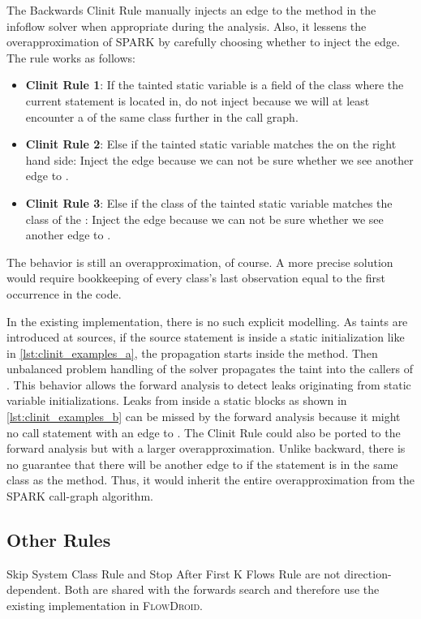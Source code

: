 \documentclass[../draft.tex]{subfiles}
\begin{document}
    The Backwards Clinit Rule manually injects an edge to the  method in the infoflow solver when appropriate during the analysis.
    Also, it lessens the overapproximation of SPARK by carefully choosing whether to inject the edge. The rule works as follows:
    \begin{itemize}
        \item \textbf{Clinit Rule 1}: If the tainted static variable is a field of the class where the current statement is located in, do not inject because we will at least encounter a  of the same class further in the call graph.
        \item \textbf{Clinit Rule 2}: Else if the tainted static variable matches the  on the right hand side: Inject the edge because we can not be sure whether we see another edge to .
        \item \textbf{Clinit Rule 3}: Else if the class of the tainted static variable matches the class of the : Inject the edge because we can not be sure whether we see another edge to .
    \end{itemize}
    The behavior is still an overapproximation, of course.
    A more precise solution would require bookkeeping of every class's last observation equal to the first occurrence in the code.

    In the existing implementation, there is no such explicit modelling.
    As taints are introduced at sources, if the source statement is inside a static initialization like in \autoref{lst:clinit_examples_a}, the propagation starts inside the  method.
    Then unbalanced problem handling of the solver propagates the taint into the callers of .
    This behavior allows the forward analysis to detect leaks originating from static variable initializations.
    Leaks from inside a static blocks as shown in \autoref{lst:clinit_examples_b} can be missed by the forward analysis because it might no call statement with an edge to .
    The Clinit Rule could also be ported to the forward analysis but with a larger overapproximation. Unlike backward, there is no guarantee that there will be another edge to  if the statement is in the same class as the  method. Thus, it would inherit the entire overapproximation from the SPARK call-graph algorithm.


    \subsection{Other Rules}
    Skip System Class Rule and Stop After First K Flows Rule are not direction-dependent.
    Both are shared with the forwards search and therefore use the existing implementation in \textsc{FlowDroid}.
\end{document}
